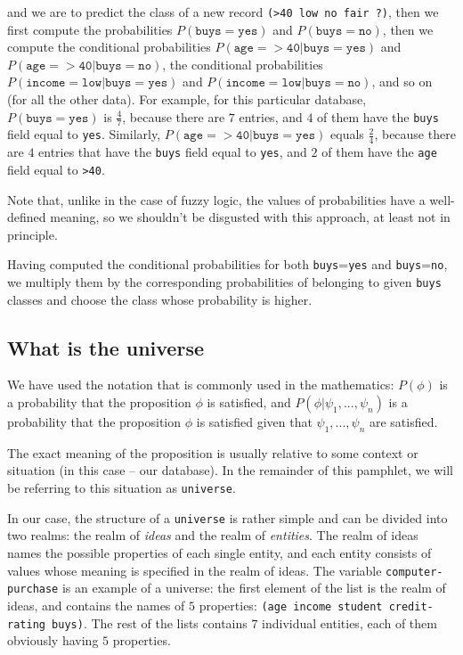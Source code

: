 and we are to predict the class of a new record
\texttt{(>40 low no fair ?)}, then we first compute
the probabilities $P(\mathtt{buys}=\mathtt{yes})$
and $P(\mathtt{buys}=\mathtt{no})$, then we compute
the conditional probabilities 
$P(\mathtt{age}=\mathtt{>40}|\mathtt{buys}=\mathtt{yes})$ and
$P(\mathtt{age}=\mathtt{>40}|\mathtt{buys}=\mathtt{no})$,
the conditional probabilities
$P(\mathtt{income}=\mathtt{low}|\mathtt{buys}=\mathtt{yes})$ and
$P(\mathtt{income}=\mathtt{low}|\mathtt{buys}=\mathtt{no})$,
and so on (for all the other data). For example, for this particular
database, $P(\mathtt{buys}=\mathtt{yes})$ is $\frac{4}{7}$,
because there are $7$ entries, and $4$ of them have
the \texttt{buys} field equal to \texttt{yes}. Similarly,
$P(\mathtt{age}=\mathtt{>40}|\mathtt{buys}=\mathtt{yes})$
equals $\frac{2}{4}$, because there are $4$ entries that have
the \texttt{buys} field equal to \texttt{yes}, and $2$ of them
have the \texttt{age} field equal to \texttt{>40}.

Note that, unlike in the case of fuzzy logic, the values
of probabilities have a well-defined meaning, so we shouldn't
be disgusted with this approach, at least not in principle.

Having computed the conditional probabilities for both
\texttt{buys}=\texttt{yes} and \texttt{buys}=\texttt{no},
we multiply them by the corresponding probabilities of
belonging to given \texttt{buys} classes and choose the
class whose probability is higher.

\subsection{What is the universe}

We have used the notation that is commonly used in the
mathematics: $P(\phi)$ is a probability that the
proposition $\phi$ is satisfied, and $P(\phi|\psi_1,...,\psi_n)$
is a probability that the proposition $\phi$ is
satisfied given that $\psi_1,...,\psi_n$ are satisfied.

The exact meaning of the proposition is usually relative
to some context or situation (in this case -- our database).
In the remainder of this pamphlet, we will be referring to
this situation as \texttt{universe}.

In our case, the structure of a \texttt{universe} is rather
simple and can be divided into two realms: the realm of
\textit{ideas} and the realm of \textit{entities}. The
realm of ideas names the possible properties of each
single entity, and each entity consists of values whose
meaning is specified in the realm of ideas. The variable
\texttt{computer-purchase} is an example of a universe: the first
element of the list is the realm of ideas, and contains
the names of $5$ properties: \texttt{(age income student
credit-rating buys)}. The rest of the lists contains $7$
individual entities, each of them obviously having $5$
properties.

